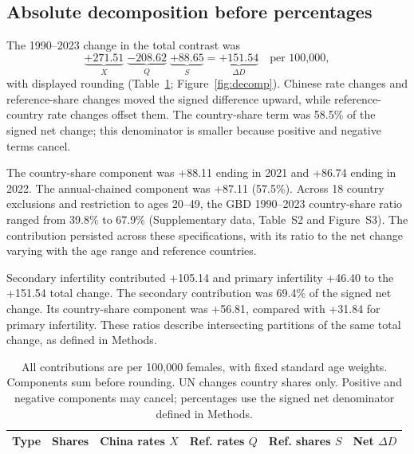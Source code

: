 \documentclass[11pt,a4paper]{article}
\begin{document}
\subsection{Absolute decomposition before percentages}
The 1990--2023 change in the total contrast was
\begin{equation}
 \underbrace{+271.51}_{X}\;\underbrace{-208.62}_{Q}\;\underbrace{+88.65}_{S}
 =\underbrace{+151.54}_{\Delta D}\quad\text{per 100,000},
\end{equation}
with displayed rounding (Table~\ref{tab:decomp}; Figure~\ref{fig:decomp}). Chinese rate changes and reference-share changes moved the signed difference upward, while reference-country rate changes offset them. The country-share term was 58.5\% of the signed net change; this denominator is smaller because positive and negative terms cancel.

The country-share component was +88.11 ending in 2021 and +86.74 ending in 2022. The annual-chained component was +87.11 (57.5\%). Across 18 country exclusions and restriction to ages 20--49, the GBD 1990--2023 country-share ratio ranged from 39.8\% to 67.9\% (Supplementary data, Table~S2 and Figure~S3). The contribution persisted across these specifications, with its ratio to the net change varying with the age range and reference countries.

Secondary infertility contributed +105.14 and primary infertility +46.40 to the +151.54 total change. The secondary contribution was 69.4\% of the signed net change. Its country-share component was +56.81, compared with +31.84 for primary infertility. These ratios describe intersecting partitions of the same total change, as defined in Methods.

\begin{table}[htbp]\centering\small{}
\caption{Symmetric PCOS contrast-change decomposition, 1990--2023, by population source.}\label{tab:decomp}
\setlength{\tabcolsep}{4pt}
\begin{tabular}{llrrrr}\toprule
Type & Shares & China rates $X$ & Ref. rates $Q$ & Ref. shares $S$ & Net $\Delta D$\\\midrule
\end{tabular}
\caption*{All contributions are per 100,000 females, with fixed standard age weights. Components sum before rounding. UN changes country shares only. Positive and negative components may cancel; percentages use the signed net denominator defined in Methods.}
\end{table}
\end{document}
